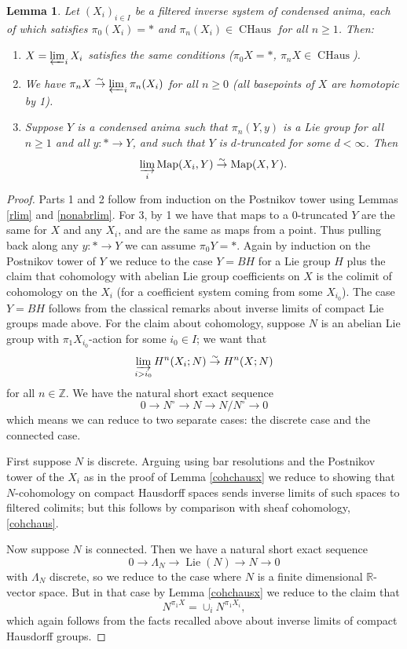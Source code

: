 \documentclass[12pt]{article}
\newtheorem{lemma}[theorem]{Lemma}
\theoremstyle{definition}
\newcommand{\on}{\operatorname}
\newcommand{\mbb}{\mathbb}
\begin{document}
\begin{lemma}\label{invlimchaus}
Let $(X_i)_{i\in I}$ be a filtered inverse system of condensed anima, each of which satisfies $\pi_0(X_i)=\ast$ and $\pi_n(X_i)\in\on{CHaus}$ for all $n\geq 1$.  Then:
\begin{enumerate}
\item $X=\varprojlim_i X_i$ satisfies the same conditions ($\pi_0X=\ast$, $\pi_nX\in\on{CHaus}$).
\item We have $\pi_n X\overset{\sim}{\rightarrow} \varprojlim_i \pi_n(X_i)$ for all $n\geq 0$ (all basepoints of $X$ are homotopic by 1).
\item Suppose $Y$ is a condensed anima such that $\pi_n(Y,y)$ is a Lie group for all $n\geq 1$ and all $y:\ast\to Y$, and such that $Y$ is $d$-truncated for some $d<\infty$.  Then 
$$\varinjlim_i \on{Map}(X_i,Y)\overset{\sim}{\rightarrow}\on{Map}(X,Y).$$
\end{enumerate}

\end{lemma}
\begin{proof}
Parts 1 and 2 follow from induction on the Postnikov tower using Lemmas \ref{rlim} and \ref{nonabrlim}.  For 3, by 1 we have that maps to a $0$-truncated $Y$ are the same for $X$ and any $X_i$, and are the same as maps from a point.  Thus pulling back along any $y:\ast \to Y$ we can assume $\pi_0Y=\ast$.  Again by induction on the Postnikov tower of $Y$ we reduce to the case $Y=BH$ for a Lie group $H$ plus the claim that cohomology with abelian Lie group coefficients on $X$ is the colimit of cohomology on the $X_i$ (for a coefficient system coming from some $X_{i_0}$).  The case $Y=BH$ follows from the classical remarks about inverse limits of compact Lie groups made above.  For the claim about cohomology, suppose $N$ is an abelian Lie group with $\pi_1X_{i_0}$-action for some $i_0\in I$; we want that
$$\varinjlim_{i>i_0}H^n(X_i;N)\overset{\sim}{\rightarrow} H^n(X;N)$$
for all $n\in\mbb{Z}$.
We have the natural short exact sequence
$$0 \to N^\circ \to N \to N/N^\circ \to 0$$
which means we can reduce to two separate cases: the discrete case and the connected case.

First suppose $N$ is discrete.  Arguing using bar resolutions and the Postnikov tower of the $X_i$ as in the proof of Lemma \ref{cohchausx} we reduce to showing that $N$-cohomology on compact Hausdorff spaces sends inverse limits of such spaces to filtered colimits; but this follows by comparison with sheaf cohomology, \ref{cohchaus}.

Now suppose $N$ is connected.  Then we have a natural short exact sequence
$$0 \to \Lambda_N \to \on{Lie}(N) \to N \to 0$$
with $\Lambda_N$ discrete, so we reduce to the case where $N$ is a finite dimensional $\mbb{R}$-vector space.  But in that case by Lemma \ref{cohchausx} we reduce to the claim that
$$N^{\pi_1X} = \cup_i N^{\pi_1X_i},$$
which again follows from the facts recalled above about inverse limits of compact Hausdorff groups.
\end{proof}
\end{document}
